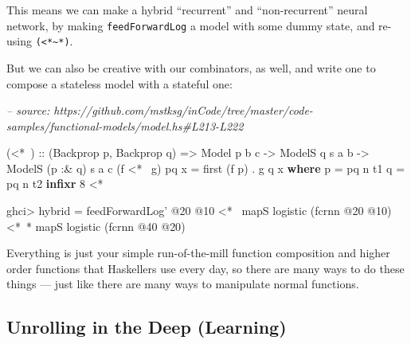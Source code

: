 \documentclass[]{article}
\newenvironment{Shaded}{}{}
\newcommand{\CommentTok}[1]{\textcolor[rgb]{0.38,0.63,0.69}{\textit{#1}}}
\newcommand{\DataTypeTok}[1]{\textcolor[rgb]{0.56,0.13,0.00}{#1}}
\newcommand{\DecValTok}[1]{\textcolor[rgb]{0.25,0.63,0.44}{#1}}
\newcommand{\FunctionTok}[1]{\textcolor[rgb]{0.02,0.16,0.49}{#1}}
\newcommand{\KeywordTok}[1]{\textcolor[rgb]{0.00,0.44,0.13}{\textbf{#1}}}
\newcommand{\NormalTok}[1]{#1}
\newcommand{\OtherTok}[1]{\textcolor[rgb]{0.00,0.44,0.13}{#1}}
\begin{document}
This means we can make a hybrid ``recurrent'' and ``non-recurrent'' neural
network, by making \texttt{feedForwardLog\textquotesingle{}} a model with some
dummy state, and re-using \texttt{(\textless{}*\textasciitilde{}*)}.

But we can also be creative with our combinators, as well, and write one to
compose a stateless model with a stateful one:

\begin{Shaded}
\begin{Highlighting}[]
\CommentTok{-- source: https://github.com/mstksg/inCode/tree/master/code-samples/functional-models/model.hs#L213-L222}

\NormalTok{(}\FunctionTok{<*~}\NormalTok{)}
\OtherTok{  ::}\NormalTok{ (}\DataTypeTok{Backprop}\NormalTok{ p, }\DataTypeTok{Backprop}\NormalTok{ q)}
    \OtherTok{=>} \DataTypeTok{Model}\NormalTok{   p         b c}
    \OtherTok{->} \DataTypeTok{ModelS}\NormalTok{       q  s a b}
    \OtherTok{->} \DataTypeTok{ModelS}\NormalTok{ (p }\FunctionTok{:&}\NormalTok{ q) s a c}
\NormalTok{(f }\FunctionTok{<*~}\NormalTok{ g) pq x }\FunctionTok{=}\NormalTok{ first (f p) }\FunctionTok{.}\NormalTok{ g q x}
  \KeywordTok{where}
\NormalTok{    p }\FunctionTok{=}\NormalTok{ pq }\FunctionTok{^^.}\NormalTok{ t1}
\NormalTok{    q }\FunctionTok{=}\NormalTok{ pq }\FunctionTok{^^.}\NormalTok{ t2}
\KeywordTok{infixr} \DecValTok{8} \FunctionTok{<*~}
\end{Highlighting}
\end{Shaded}

\begin{Shaded}
\begin{Highlighting}[]
\NormalTok{ghci}\FunctionTok{>}\NormalTok{ hybrid }\FunctionTok{=}\NormalTok{ feedForwardLog' }\FunctionTok{@}\DecValTok{20} \FunctionTok{@}\DecValTok{10}
          \FunctionTok{<*~}\NormalTok{  mapS logistic (fcrnn }\FunctionTok{@}\DecValTok{20} \FunctionTok{@}\DecValTok{10}\NormalTok{)}
          \FunctionTok{<*~*}\NormalTok{ mapS logistic (fcrnn }\FunctionTok{@}\DecValTok{40} \FunctionTok{@}\DecValTok{20}\NormalTok{)}
\end{Highlighting}
\end{Shaded}

Everything is just your simple run-of-the-mill function composition and higher
order functions that Haskellers use every day, so there are many ways to do
these things --- just like there are many ways to manipulate normal functions.

\hypertarget{unrolling-in-the-deep-learning}{%
\subsection{Unrolling in the Deep
(Learning)}\label{unrolling-in-the-deep-learning}}
\end{document}
